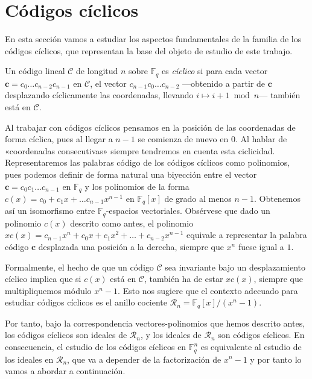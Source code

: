 
\chapter{Códigos cíclicos}

En esta sección vamos a estudiar los aspectos fundamentales de la familia de los códigos cíclicos, que representan la base del objeto de estudio de este trabajo.

\begin{definition}
  Un código lineal \(\mathcal C\) de longitud \(n\) sobre \(\mathbb F_q\) es \textit{cíclico} si para cada vector \(\mathbf c = c_0\dots c_{n-2}c_{n-1}\) en \(\mathcal C\), el vector \(c_{n-1}c_0\dots c_{n-2}\) —obtenido a partir de \(\mathbf c\) desplazando cíclicamente las coordenadas, llevando \(i \mapsto i +1 \bmod n\)— también está en \(\mathcal C\).
\end{definition}

Al trabajar con códigos cíclicos pensamos en la posición de las coordenadas de forma cíclica, pues al llegar a \(n -1\) se comienza de nuevo en \(0\).
Al hablar de «coordenadas consecutivas» siempre tendremos en cuenta esta ciclicidad.
Representaremos las palabras código de los códigos cíclicos como polinomios, pues podemos definir de forma natural una biyección entre el vector \(\mathbf c = c_0c_1\dots c_{n-1}\) en \(\mathbb F_q\) y los polinomios de la forma \(c(x) = c_0 + c_1x + \dots c_{n-1}x^{n-1}\) en \(\mathbb F_q[x]\) de grado al menos \(n-1\). 
Obtenemos así un isomorfismo entre \(\mathbb F_q\)-espacios vectoriales.
Obsérvese que dado un polinomio \(c(x)\) descrito como antes, el polinomio \(xc(x) = c_{n-1}x^n + c_0x + c_1x^2 + \dots + c_{n-2}x^{n-1}\) equivale a representar la palabra código \(\mathbf c\) desplazada una posición a la derecha, siempre que \(x^n\) fuese igual a \(1\).

Formalmente, el hecho de que un código \(\mathcal C\) sea invariante bajo un desplazamiento cíclico implica que si \(c(x)\) está en \(\mathcal C\), también ha de estar \(xc(x)\), siempre que multipliquemos módulo \(x^n -1\). 
Esto nos sugiere que el contexto adecuado para estudiar códigos cíclicos es el anillo cociente \(\mathcal R_n = \mathbb F_q[x]/(x^n - 1)\).

Por tanto, bajo la correspondencia vectores-polinomios que hemos descrito antes, los códigos cíclicos son ideales de \(\mathcal R_n\), y los ideales de \(\mathcal R_n\) son códigos cíclicos.
En consecuencia, el estudio de los códigos cíclicos en \(\mathbb F_q^n\) es equivalente al estudio de los ideales en \(\mathcal R_n\), que va a depender de la factorización de \(x^n-1\) y por tanto lo vamos a abordar a continuación.

